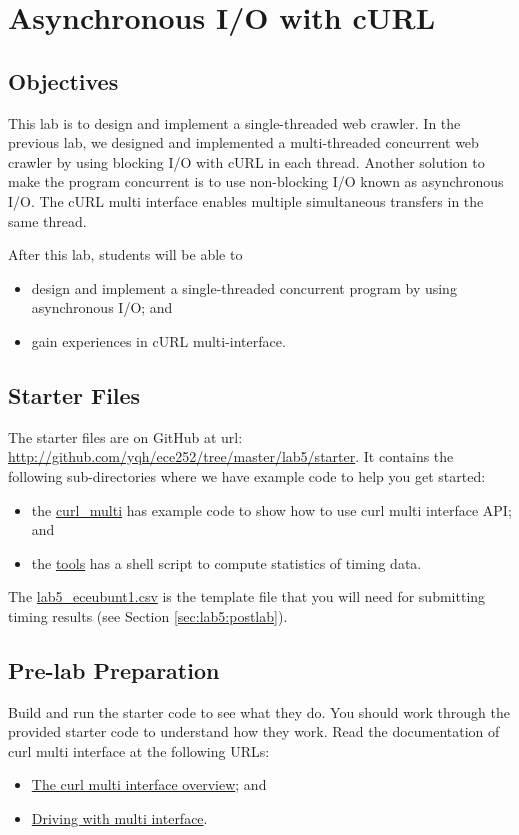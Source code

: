 \chapter{Asynchronous I/O with cURL}

\section{Objectives}
This lab is to design and implement a single-threaded web crawler. In the previous lab, we designed and implemented a multi-threaded concurrent web crawler by using blocking I/O with cURL in each thread. Another solution to make the program concurrent is to use non-blocking I/O known as asynchronous I/O. The cURL multi interface enables multiple simultaneous transfers in the same thread.


After this lab, students will be able to
\begin{itemize}
\item design and implement a single-threaded concurrent program by using asynchronous I/O; and
\item gain experiences in cURL multi-interface.
\end{itemize}

\section{Starter Files}
The starter files are on GitHub at url: \url{http://github.com/yqh/ece252/tree/master/lab5/starter}. It contains the following sub-directories where we have example code to help you get started:

\begin{itemize}
\item the \href{http://github.com/yqh/ece252/tree/master/lab5/starter/curl_multi}{curl\_multi} has example code to show how to use curl multi interface API; and
\item the \href{http://github.com/yqh/ece252/tree/master/lab5/starter/tools}{tools} has a shell script to compute statistics of timing data.
\end{itemize}
The \href{http://github.com/yqh/ece252/tree/master/lab5/starter/lab5_eceubuntu1.csv}{lab5\_eceubunt1.csv} is the template file that you will need for submitting timing results (see Section \ref{sec:lab5:postlab}).

\section{Pre-lab Preparation}
Build and run the starter code to see what they do. You should work through the provided starter code to understand how they work. 
Read the documentation of curl multi interface at the following URLs:
  \begin{itemize}
  \item \href{https://curl.haxx.se/libcurl/c/libcurl-multi.html}{The curl multi interface overview}; and
  \item \href{https://everything.curl.dev/libcurl/drive/multi}{Driving with multi interface}.
  \end{itemize}

